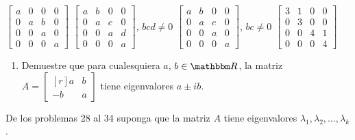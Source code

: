 \begin{tasks}[
    style=enumerate,
    label-offset = 3mm,
    ]
    \task $\begin{bmatrix*}a & 0 & 0 & 0 \\ 0 & a & b & 0 \\ 0 & 0 & a & 0 \\ 0 & 0 & 0 & a\end{bmatrix*}$
    \task $\begin{bmatrix*}a & b & 0 & 0 \\ 0 & a & c & 0 \\ 0 & 0 & a & d \\ 0 & 0 & 0 & a\end{bmatrix*}$, $b c d \neq 0$
    \task $\begin{bmatrix*}a & b & 0 & 0 \\ 0 & a & c & 0 \\ 0 & 0 & a & 0 \\ 0 & 0 & 0 & a\end{bmatrix*}$, $b c \neq 0$
    \task $\begin{bmatrix*}3 & 1 & 0 & 0 \\ 0 & 3 & 0 & 0 \\ 0 & 0 & 4 & 1 \\ 0 & 0 & 0 & 4\end{bmatrix*}$
\end{tasks}
\begin{enumerate}[start=27]
    \item Demuestre que para cualesquiera $a$, $b \in \RR$, la matriz $A=\begin{bmatrix*}[r]a & b \\ -b & a\end{bmatrix*}$ tiene eigenvalores $a \pm i b$.
\end{enumerate}
De los problemas 28 al 34 suponga que la matriz $A$ tiene eigenvalores $\lambda_{1}, \lambda_{2}, \dots, \lambda_{k}$.

